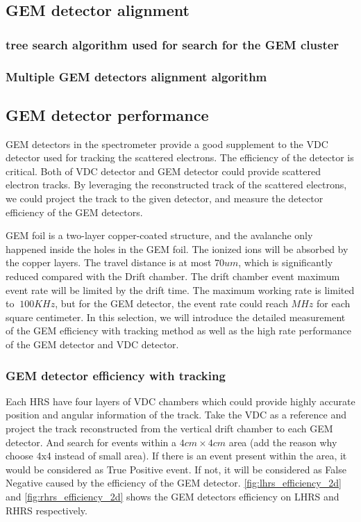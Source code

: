 \subsection{GEM detector alignment}

\subsubsection{tree search algorithm used for search for the GEM cluster}
\subsubsection{Multiple GEM detectors alignment algorithm }
\subsection{GEM detector performance}

GEM detectors in the spectrometer provide a good supplement to the VDC detector used for tracking the scattered electrons. The efficiency of the detector is critical. Both of VDC detector and GEM detector could provide scattered electron tracks. By leveraging the reconstructed track of the scattered electrons, we could project the track to the given detector, and measure the detector efficiency of the GEM detectors.  

GEM foil is a two-layer copper-coated structure, and the avalanche only happened inside the holes in the GEM foil. The ionized ions will be absorbed by the copper layers. The travel distance is at most $70um$, which is significantly reduced compared with  the Drift chamber.  The drift chamber event maximum event rate will be limited by the drift time. The maximum working rate is limited to $~100KHz$, but for the GEM detector, the event rate could reach $MHz$ for each square centimeter. In this selection, we will introduce the detailed measurement of the GEM efficiency with tracking method as well as the high rate performance of the GEM detector and VDC detector. 

\subsubsection{GEM detector efficiency with tracking}

Each HRS have four layers of VDC chambers which could provide highly accurate position and angular information of the track. Take the VDC as a reference and project the track reconstructed from the vertical drift chamber to each GEM detector. And search for events within a  $4cm \times 4 cm$ area (add the reason why choose 4x4 instead of small area). If there is an event present within the area, it would be considered as True Positive event. If not, it will be considered as False Negative caused by the efficiency of the GEM detector. \ref{fig:lhrs_efficiency_2d}  and \ref{fig:rhrs_efficiency_2d} shows the GEM detectors efficiency on LHRS and RHRS respectively. 

